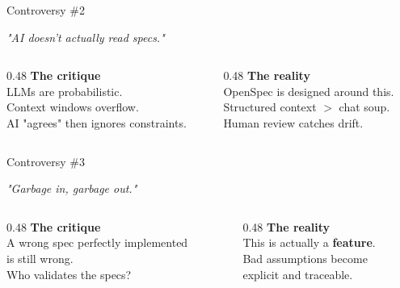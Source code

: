 \documentclass[aspectratio=169,18pt]{beamer}
\begin{document}
\begin{frame}{Controversy \#2}
  \vspace{0.5em}
  \begin{center}
    \large\textit{"AI doesn't actually read specs."}
  \end{center}
  \vspace{0.8em}
  \begin{columns}[T]
    \begin{column}{0.48\textwidth}
      \textbf{\color{openred}The critique}\\[0.4em]
      \small LLMs are probabilistic.\\
      Context windows overflow.\\
      AI "agrees" then ignores constraints.
    \end{column}
    \begin{column}{0.48\textwidth}
      \textbf{\color{opengreen}The reality}\\[0.4em]
      \small OpenSpec is designed around this.\\
      Structured context $>$ chat soup.\\
      Human review catches drift.
    \end{column}
  \end{columns}
\end{frame}

\begin{frame}{Controversy \#3}
  \vspace{0.5em}
  \begin{center}
    \large\textit{"Garbage in, garbage out."}
  \end{center}
  \vspace{0.8em}
  \begin{columns}[T]
    \begin{column}{0.48\textwidth}
      \textbf{\color{openred}The critique}\\[0.4em]
      \small A wrong spec perfectly implemented\\
      is still wrong.\\
      Who validates the specs?
    \end{column}
    \begin{column}{0.48\textwidth}
      \textbf{\color{opengreen}The reality}\\[0.4em]
      \small This is actually a \textbf{feature}.\\
      Bad assumptions become\\
      explicit and traceable.
    \end{column}
  \end{columns}
\end{frame}
\end{document}
